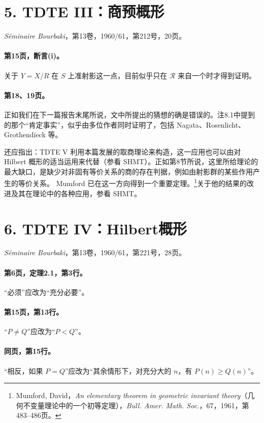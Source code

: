 \section*{5. TDTE III：商预概形}
\noindent\textit{Séminaire Bourbaki}，第13卷，1960/61，第212号，20页。

\paragraph{第15页，断言(i)。}关于 $Y=X/R$ 在 $S$ 上准射影这一点，目前似乎只在 $\mathcal R$ 来自一个时才得到证明。

\paragraph{第18、19页。}正如我们在下一篇报告末尾所说，文中所提出的猜想的确是错误的。注8.1中提到的那个“肯定事实”，似乎由多位作者同时证明了，包括 Nagata、Rosenlicht、Grothendieck 等。

还应指出：TDTE V 利用本篇发展的取商理论来构造，这一应用也可以由对 Hilbert 概形的适当运用来代替（参看 SHMT）。正如第8节所说，这里所给理论的最大缺口，是缺少对非固有等价关系的商的存在判据，例如由射影群的某些作用产生的等价关系。
Mumford 已在这一方向得到一个重要定理。\footnote{Mumford, David，\textit{An elementary theorem in geometric invariant theory}（几何不变量理论中的一个初等定理），\textit{Bull. Amer. Math. Soc.}，67，1961，第483--486页。}关于他的结果的改进及其在理论中的各种应用，参看 SHMT。

\section*{6. TDTE IV：Hilbert概形}
\noindent\textit{Séminaire Bourbaki}，第13卷，1960/61，第221号，28页。

\paragraph{第6页，定理2.1，第3行。}“必须”应改为“充分必要”。

\paragraph{第15页，第13行。}“$P\ne Q$”应改为“$P<Q$”。

\paragraph{同页，第15行。}“相反，如果 $P=Q$”应改为“其余情形下，对充分大的 $n$，有 $P(n)\ge Q(n)$”。

